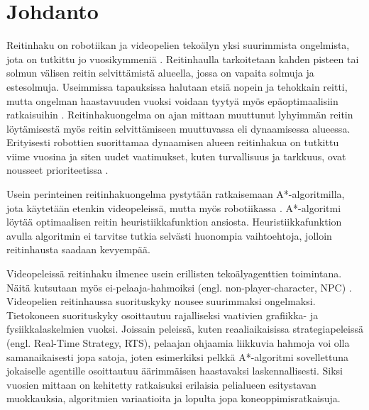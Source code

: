 \documentclass[utf8]{gradu3}
\begin{document}
\bigskip

\mainmatter

\chapter{Johdanto}

Reitinhaku on robotiikan ja videopelien tekoälyn yksi suurimmista ongelmista, jota on tutkittu jo vuosikymmeniä \parencite{abd2015comprehensive,cui2011based}. Reitinhaulla tarkoitetaan kahden pisteen tai solmun välisen reitin selvittämistä alueella, jossa on vapaita solmuja ja estesolmuja. Useimmissa tapauksissa halutaan etsiä nopein ja tehokkain reitti, mutta ongelman haastavuuden vuoksi voidaan tyytyä myös epäoptimaalisiin ratkaisuihin \parencite{rahmani2022towards}. Reitinhakuongelma on ajan mittaan muuttunut lyhyimmän reitin löytämisestä myös reitin selvittämiseen muuttuvassa eli dynaamisessa alueessa. Erityisesti robottien suorittamaa dynaamisen alueen reitinhakua on tutkittu viime vuosina ja siten uudet vaatimukset, kuten turvallisuus ja tarkkuus, ovat nousseet prioriteetissa \parencite{karur2021survey}.

Usein perinteinen reitinhakuongelma pystytään ratkaisemaan A*-algoritmilla, jota käytetään etenkin videopeleissä, mutta myös robotiikassa \parencite{abd2015comprehensive,botea2013pathfinding,cui2011based}. A*-algoritmi löytää optimaalisen reitin heuristiikkafunktion ansiosta. Heuristiikkafunktion avulla algoritmin ei tarvitse tutkia selvästi huonompia vaihtoehtoja, jolloin reitinhausta saadaan kevyempää.

Videopeleissä reitinhaku ilmenee usein erillisten tekoälyagenttien toimintana. Näitä kutsutaan myös ei-pelaaja-hahmoiksi (engl. non-player-character, NPC) \parencite{cui2011based}. Videopelien reitinhaussa suorituskyky nousee suurimmaksi ongelmaksi. Tietokoneen suorituskyky osoittautuu rajalliseksi vaativien grafiikka- ja fysiikkalaskelmien vuoksi. Joissain peleissä, kuten reaaliaikaisissa strategiapeleissä (engl. Real-Time Strategy, RTS), pelaajan ohjaamia liikkuvia hahmoja voi olla samanaikaisesti jopa satoja, joten esimerkiksi pelkkä A*-algoritmi sovellettuna jokaiselle agentille osoittautuu äärimmäisen haastavaksi laskennallisesti. Siksi vuosien mittaan on kehitetty ratkaisuksi erilaisia pelialueen esitystavan muokkauksia, algoritmien variaatioita ja lopulta jopa koneoppimisratkaisuja.
\end{document}
